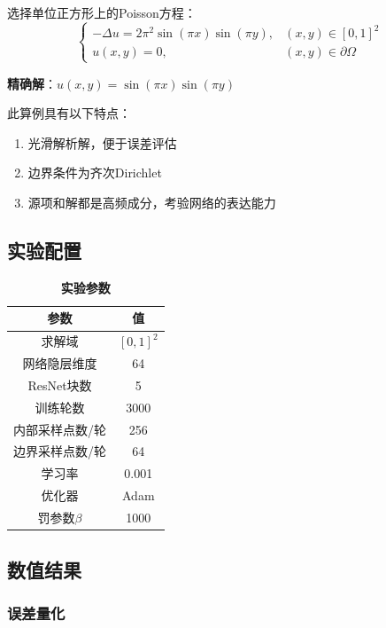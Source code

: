 \documentclass{article}
\begin{document}
选择单位正方形上的Poisson方程：
\begin{equation}
\begin{cases}
-\Delta u = 2\pi^2\sin(\pi x)\sin(\pi y), & (x,y) \in [0,1]^2 \\
u(x,y) = 0, & (x,y) \in \partial\Omega
\end{cases}
\end{equation}

\textbf{精确解}：$u(x,y) = \sin(\pi x)\sin(\pi y)$

此算例具有以下特点：
\begin{enumerate}
  \item 光滑解析解，便于误差评估
  \item 边界条件为齐次Dirichlet
  \item 源项和解都是高频成分，考验网络的表达能力
\end{enumerate}

\subsection{实验配置}

\begin{table}[h]
    \caption{\textbf{实验参数}}
    \centering
    \begin{tabular}{cc}
    \toprule
    参数 & 值 \\
    \midrule
    求解域 & $[0,1]^2$ \\
    网络隐层维度 & 64 \\
    ResNet块数 & 5 \\
    训练轮数 & 3000 \\
    内部采样点数/轮 & 256 \\
    边界采样点数/轮 & 64 \\
    学习率 & 0.001 \\
    优化器 & Adam \\
    罚参数$\beta$ & 1000 \\
    \bottomrule
    \end{tabular}
\end{table}

\subsection{数值结果}

\subsubsection{误差量化}
\end{document}

